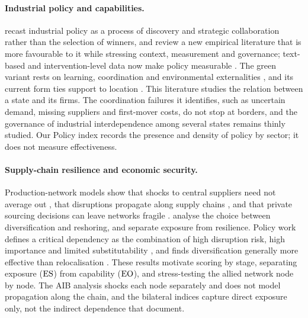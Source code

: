 \paragraph{Industrial policy and capabilities.} \citet{rodrik2004industrial} recast industrial
policy as a process of discovery and strategic collaboration rather than the selection of
winners, and \citet{juhasz2024new} review a new empirical literature that is more favourable to it
while stressing context, measurement and governance; text-based and intervention-level data now
make policy measurable \citep{juhasz2022who, evenett2024return}. The green variant rests on
learning, coordination and environmental externalities \citep{rodrik2014green}, and its current
form ties support to location \citep{bown2023industrial, bistline2023economic}. This literature
studies the relation between a state and its firms. The coordination failures it identifies, such
as uncertain demand, missing suppliers and first-mover costs, do not stop at borders, and the
governance of industrial interdependence among several states remains thinly studied. Our Policy
index records the presence and density of policy by sector; it does not measure effectiveness.

\paragraph{Supply-chain resilience and economic security.} Production-network models show that
shocks to central suppliers need not average out \citep{acemoglu2012network,
carvalho2019production, baqaee2019macroeconomic}, that disruptions propagate along supply chains
\citep{carvalho2021supply}, and that private sourcing decisions can leave networks fragile
\citep{elliott2022supply}. \citet{grossman2023supply} analyse the choice between diversification
and reshoring, and \citet{baldwin2022risks} separate exposure from resilience. Policy work defines
a critical dependency as the combination of high disruption risk, high importance and limited
substitutability \citep{oecd2025economic}, and finds diversification generally more effective
than relocalisation \citep{oecd2025supply, thakurweigold2024promoting}. These results motivate
scoring by stage, separating exposure ($\mathrm{ES}$) from capability ($\mathrm{EO}$), and stress-testing the
allied network node by node. The AIB analysis shocks each node separately and does not model
propagation along the chain, and the bilateral indices capture
direct exposure only, not the indirect dependence that \citet{freund2024us} document.

